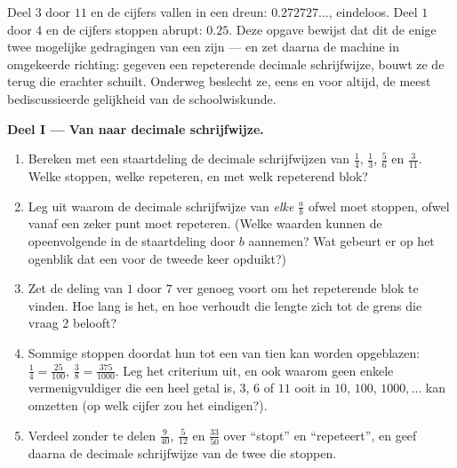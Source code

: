 \begin{problem}
\label{pb:g9:fractions:1}
Deel $3$ door $11$ en de cijfers vallen in een dreun: $0.272727\ldots$, eindeloos.
Deel $1$ door $4$ en de cijfers stoppen abrupt: $0.25$. Deze opgave bewijst dat
dit de enige twee mogelijke gedragingen van een  zijn --- en zet daarna de
machine in omgekeerde richting: gegeven een repeterende decimale schrijfwijze,
bouwt ze de  terug die erachter schuilt. Onderweg beslecht ze, eens en voor
altijd, de meest bediscussieerde gelijkheid van de schoolwiskunde.

\medskip
\noindent\textbf{Deel I --- Van  naar decimale schrijfwijze.}
\begin{enumerate}
  \item Bereken met een staartdeling de decimale schrijfwijzen van $\frac14$,
        $\frac13$, $\frac56$ en $\frac{3}{11}$. Welke stoppen, welke repeteren, en
        met welk repeterend blok?
  \item Leg uit waarom de decimale schrijfwijze van \emph{elke}  $\frac ab$
        ofwel moet stoppen, ofwel vanaf een zeker punt moet repeteren. (Welke
        waarden kunnen de opeenvolgende  in de staartdeling door $b$
        aannemen? Wat gebeurt er op het ogenblik dat een  voor de tweede keer
        opduikt?)
  \item Zet de deling van $1$ door $7$ ver genoeg voort om het repeterende blok te
        vinden. Hoe lang is het, en hoe verhoudt die lengte zich tot de grens die
        vraag 2 belooft?
  \item Sommige  stoppen doordat hun  tot een  van tien kan
        worden opgeblazen: $\frac14 = \frac{25}{100}$,
        $\frac{3}{8} = \frac{375}{1000}$. Leg het criterium uit, en ook waarom
        geen enkele vermenigvuldiger die een heel getal is, $3$, $6$ of $11$ ooit
        in $10$, $100$, $1000, \dots$ kan omzetten (op welk cijfer zou het 
        eindigen?).
  \item Verdeel zonder te delen $\frac{9}{40}$, $\frac{5}{12}$ en $\frac{33}{50}$
        over ``stopt'' en ``repeteert'', en geef daarna de decimale schrijfwijze
        van de twee die stoppen.
\end{enumerate}


\end{problem}
